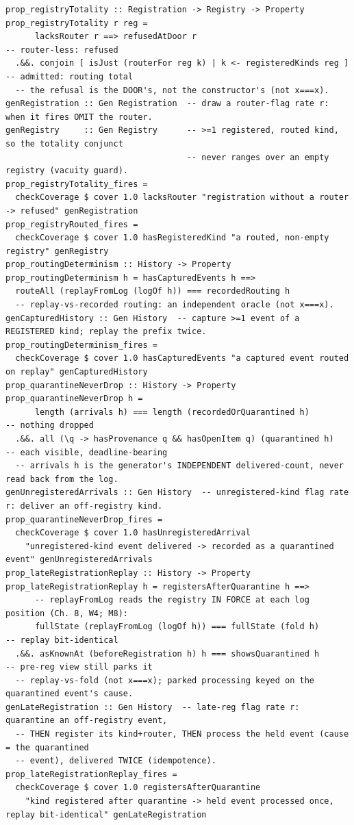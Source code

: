 \documentclass[11pt,a4paper]{article}
\begin{document}
\begin{lstlisting}
prop_registryTotality :: Registration -> Registry -> Property
prop_registryTotality r reg =
      lacksRouter r ==> refusedAtDoor r                                -- router-less: refused
  .&&. conjoin [ isJust (routerFor reg k) | k <- registeredKinds reg ] -- admitted: routing total
  -- the refusal is the DOOR's, not the constructor's (not x===x).
genRegistration :: Gen Registration  -- draw a router-flag rate r: when it fires OMIT the router.
genRegistry     :: Gen Registry      -- >=1 registered, routed kind, so the totality conjunct
                                     -- never ranges over an empty registry (vacuity guard).
prop_registryTotality_fires =
  checkCoverage $ cover 1.0 lacksRouter "registration without a router -> refused" genRegistration
prop_registryRouted_fires =
  checkCoverage $ cover 1.0 hasRegisteredKind "a routed, non-empty registry" genRegistry
prop_routingDeterminism :: History -> Property
prop_routingDeterminism h = hasCapturedEvents h ==>
  routeAll (replayFromLog (logOf h)) === recordedRouting h
  -- replay-vs-recorded routing: an independent oracle (not x===x).
genCapturedHistory :: Gen History  -- capture >=1 event of a REGISTERED kind; replay the prefix twice.
prop_routingDeterminism_fires =
  checkCoverage $ cover 1.0 hasCapturedEvents "a captured event routed on replay" genCapturedHistory
prop_quarantineNeverDrop :: History -> Property
prop_quarantineNeverDrop h =
      length (arrivals h) === length (recordedOrQuarantined h)         -- nothing dropped
  .&&. all (\q -> hasProvenance q && hasOpenItem q) (quarantined h)    -- each visible, deadline-bearing
  -- arrivals h is the generator's INDEPENDENT delivered-count, never read back from the log.
genUnregisteredArrivals :: Gen History  -- unregistered-kind flag rate r: deliver an off-registry kind.
prop_quarantineNeverDrop_fires =
  checkCoverage $ cover 1.0 hasUnregisteredArrival
    "unregistered-kind event delivered -> recorded as a quarantined event" genUnregisteredArrivals
prop_lateRegistrationReplay :: History -> Property
prop_lateRegistrationReplay h = registersAfterQuarantine h ==>
      -- replayFromLog reads the registry IN FORCE at each log position (Ch. 8, W4; M8):
      fullState (replayFromLog (logOf h)) === fullState (fold h)       -- replay bit-identical
  .&&. asKnownAt (beforeRegistration h) h === showsQuarantined h       -- pre-reg view still parks it
  -- replay-vs-fold (not x===x); parked processing keyed on the quarantined event's cause.
genLateRegistration :: Gen History  -- late-reg flag rate r: quarantine an off-registry event,
  -- THEN register its kind+router, THEN process the held event (cause = the quarantined
  -- event), delivered TWICE (idempotence).
prop_lateRegistrationReplay_fires =
  checkCoverage $ cover 1.0 registersAfterQuarantine
    "kind registered after quarantine -> held event processed once, replay bit-identical" genLateRegistration
\end{lstlisting}
\end{document}
